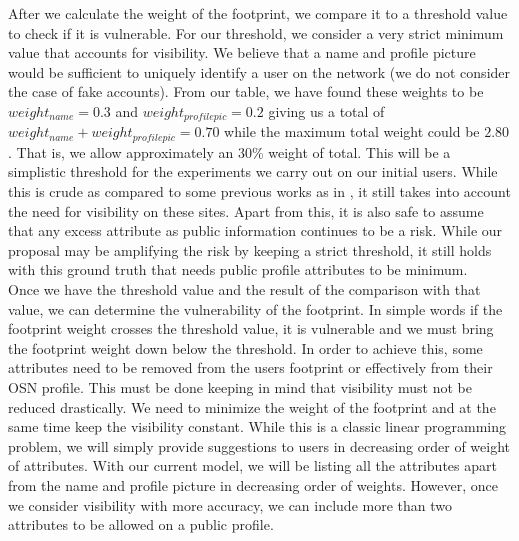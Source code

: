 \documentclass[10pt,conference]{IEEEtran}
\begin{document}
After we calculate the weight of the footprint, we compare it to a threshold value to check if it is vulnerable. For our threshold, we consider a very strict minimum value that accounts for visibility. We believe that a name and profile picture would be sufficient to uniquely identify a user on the network (we do not consider the case of fake accounts). From our table, we have found these weights to be $ weight_{name} = 0.3 $ and $ weight_{profilepic} = 0.2 $ giving us a total of $ weight_{name} +  weight_{profilepic} = 0.70 $ while the maximum total weight could be $ 2.80 $. That is, we allow approximately an 30\% weight of total. This will be a simplistic threshold for the experiments we carry out on our initial users. While this is crude as compared to some previous works as in \cite{pidx}, it still takes into account the need for visibility on these sites. Apart from this, it is also safe to assume that any excess attribute as public information continues to be a risk. While our proposal may be amplifying the risk by keeping a strict threshold, it still holds with this ground truth that needs public profile attributes to be minimum. \\

Once we have the threshold value and the result of the comparison with that value, we can determine the vulnerability of the footprint. In simple words if the footprint weight crosses the threshold value, it is vulnerable and we must bring the footprint weight down below the threshold. In order to achieve this, some attributes need to be removed from the users footprint or effectively from their OSN profile. This must be done keeping in mind that visibility must not be reduced drastically. We need to minimize the weight of the footprint and at the same time keep the visibility constant. While this is a classic linear programming problem, we will simply provide suggestions to users in decreasing order of weight of attributes. With our current model, we will be listing all the attributes apart from the name and profile picture in decreasing order of weights. However, once we consider visibility with more accuracy, we can include more than two attributes to be allowed on a public profile. \\
 
\end{document}
